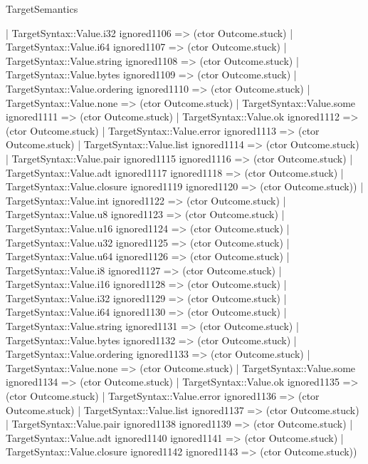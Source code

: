 \begin{lexlean}{TargetSemantics}
\begin{semanticmodule}
{                | TargetSyntax::Value.i32 ignored1106 => (ctor Outcome.stuck)
                | TargetSyntax::Value.i64 ignored1107 => (ctor Outcome.stuck)
                | TargetSyntax::Value.string ignored1108 => (ctor Outcome.stuck)
                | TargetSyntax::Value.bytes ignored1109 => (ctor Outcome.stuck)
                | TargetSyntax::Value.ordering ignored1110 => (ctor Outcome.stuck)
                | TargetSyntax::Value.none => (ctor Outcome.stuck)
                | TargetSyntax::Value.some ignored1111 => (ctor Outcome.stuck)
                | TargetSyntax::Value.ok ignored1112 => (ctor Outcome.stuck)
                | TargetSyntax::Value.error ignored1113 => (ctor Outcome.stuck)
                | TargetSyntax::Value.list ignored1114 => (ctor Outcome.stuck)
                | TargetSyntax::Value.pair ignored1115 ignored1116 => (ctor Outcome.stuck)
                | TargetSyntax::Value.adt ignored1117 ignored1118 => (ctor Outcome.stuck)
                | TargetSyntax::Value.closure ignored1119 ignored1120 => (ctor Outcome.stuck))
              | TargetSyntax::Value.int ignored1122 => (ctor Outcome.stuck)
              | TargetSyntax::Value.u8 ignored1123 => (ctor Outcome.stuck)
              | TargetSyntax::Value.u16 ignored1124 => (ctor Outcome.stuck)
              | TargetSyntax::Value.u32 ignored1125 => (ctor Outcome.stuck)
              | TargetSyntax::Value.u64 ignored1126 => (ctor Outcome.stuck)
              | TargetSyntax::Value.i8 ignored1127 => (ctor Outcome.stuck)
              | TargetSyntax::Value.i16 ignored1128 => (ctor Outcome.stuck)
              | TargetSyntax::Value.i32 ignored1129 => (ctor Outcome.stuck)
              | TargetSyntax::Value.i64 ignored1130 => (ctor Outcome.stuck)
              | TargetSyntax::Value.string ignored1131 => (ctor Outcome.stuck)
              | TargetSyntax::Value.bytes ignored1132 => (ctor Outcome.stuck)
              | TargetSyntax::Value.ordering ignored1133 => (ctor Outcome.stuck)
              | TargetSyntax::Value.none => (ctor Outcome.stuck)
              | TargetSyntax::Value.some ignored1134 => (ctor Outcome.stuck)
              | TargetSyntax::Value.ok ignored1135 => (ctor Outcome.stuck)
              | TargetSyntax::Value.error ignored1136 => (ctor Outcome.stuck)
              | TargetSyntax::Value.list ignored1137 => (ctor Outcome.stuck)
              | TargetSyntax::Value.pair ignored1138 ignored1139 => (ctor Outcome.stuck)
              | TargetSyntax::Value.adt ignored1140 ignored1141 => (ctor Outcome.stuck)
              | TargetSyntax::Value.closure ignored1142 ignored1143 => (ctor Outcome.stuck))
}
\end{semanticmodule}
\end{lexlean}
